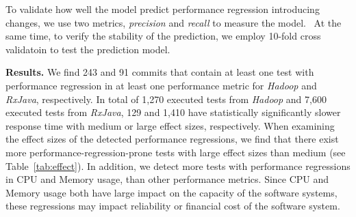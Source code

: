 To validate how well the model predict performance regression introducing changes, we use two metrics, \emph{precision} and \emph{recall} to measure the model.  At the same time, to verify the stability of the prediction, we employ 10-fold cross validatoin to test the prediction model.


 \textbf{Results.}
We find 243 and 91 commits that contain at least one test with performance regression in at least one performance metric for \emph{Hadoop} and \emph{RxJava}, respectively. In total of 1,270 executed tests from \emph{Hadoop} and 7,600 executed tests from \emph{RxJava}, 129 and 1,410 have statistically significantly slower response time with medium or large effect sizes, respectively. When examining the effect sizes of the detected performance regressions, we find that there exist more performance-regression-prone tests with large effect sizes than medium (see Table~\ref{tab:effect}). In addition, we detect more tests with performance regressions in CPU and Memory usage, than other performance metrics. Since CPU and Memory usage both have large impact on the capacity of the software systems, these regressions may impact reliability or financial cost of the software system. 
